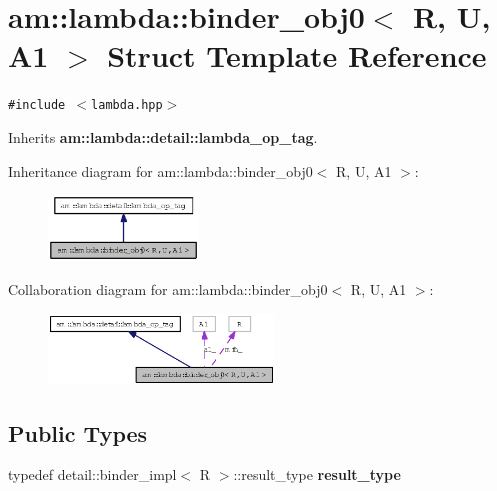 \section{am::lambda::binder\_\-obj0$<$ R, U, A1 $>$ Struct Template Reference}
\label{structam_1_1lambda_1_1binder__obj0}
{\tt \#include $<$lambda.hpp$>$}

Inherits {\bf am::lambda::detail::lambda\_\-op\_\-tag}.

Inheritance diagram for am::lambda::binder\_\-obj0$<$ R, U, A1 $>$:\begin{figure}[H]
\begin{center}
\leavevmode
\includegraphics[width=113pt]{structam_1_1lambda_1_1binder__obj0__inherit__graph}
\end{center}
\end{figure}
Collaboration diagram for am::lambda::binder\_\-obj0$<$ R, U, A1 $>$:\begin{figure}[H]
\begin{center}
\leavevmode
\includegraphics[width=170pt]{structam_1_1lambda_1_1binder__obj0__coll__graph}
\end{center}
\end{figure}
\subsection*{Public Types}
\begin{CompactItemize}
\item 
typedef detail::binder\_\-impl$<$ R $>$::result\_\-type \textbf{result\_\-type}\label{structam_1_1lambda_1_1binder__obj0_cb6658302f1fb19996bfbc8c3a318254}

\end{CompactItemize}
